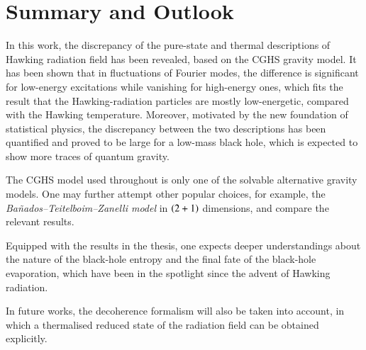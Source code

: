 \chapter{Summary and Outlook}
\label{chap:summary}

In this work, the discrepancy of the pure-state and thermal descriptions of 
Hawking radiation field has been revealed, based on the CGHS gravity model. It 
has been shown that in fluctuations of Fourier modes, the difference is 
significant for low-energy excitations while vanishing for high-energy ones, 
which fits the result that the Hawking-radiation particles are mostly 
low-energetic, compared with the Hawking temperature. Moreover, motivated by the 
new foundation of statistical physics, the discrepancy between the two 
descriptions has been quantified and proved to be large for a low-mass 
black hole, which is expected to show more traces of quantum gravity.

The CGHS model used throughout is only one of the solvable alternative gravity 
models. One may further attempt other popular choices, for example, the 
\emph{Bañados--Teitelboim--Zanelli model} \cite{Banados1992} in ${\left(2+1\right)}$ 
dimensions, and compare the relevant results.

Equipped with the results in the thesis, one expects deeper understandings 
about the nature of the black-hole entropy and the final fate of the black-hole 
evaporation, which have been in the spotlight since the advent of Hawking 
radiation.

In future works, the decoherence formalism will also be taken into account, in 
which a thermalised reduced state of the radiation field can be obtained 
explicitly.